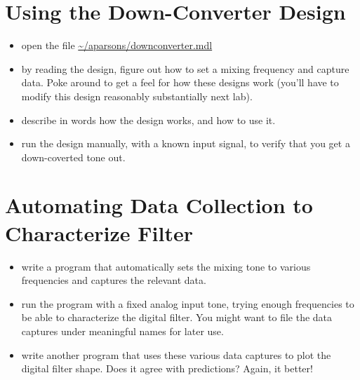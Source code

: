 \documentclass[11pt]{article}
\begin{document}
\section{Using the Down-Converter Design}

\begin{itemize}
\item open the file \url{~/aparsons/downconverter.mdl}
\item by reading the design, figure out how to set a mixing frequency and capture data.  Poke around to get a feel for how these designs work (you'll have to modify this design reasonably substantially next lab).
\item describe in words how the design works, and how to use it.
\item run the design manually, with a known input signal, to verify that you get a down-coverted tone out.
\end{itemize}

\section{Automating Data Collection to Characterize Filter}

\begin{itemize}
\item write a program that automatically sets the mixing tone to various frequencies and captures the relevant data.
\item run the program with a fixed analog input tone, trying enough frequencies to be able to characterize the
digital filter.  You might want to file the data captures under meaningful names for later use.
\item write another program that uses these various data captures to plot the digital filter shape.  Does it
agree with predictions?  Again, it better!
\end{itemize}
\end{document}
